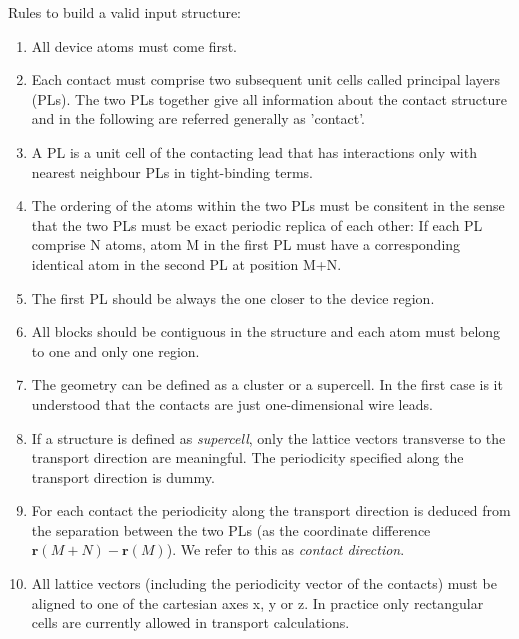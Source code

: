 Rules to build a valid input structure:
\begin{enumerate}
\item \label{rule1} All device atoms must come first.
\item \label{rule2} Each contact must comprise two subsequent unit cells called
  principal layers (PLs). The two PLs together give all information about the
  contact structure and in the following are referred generally as 'contact'.
\item \label{rule3} A PL is a unit cell of the contacting lead that has
  interactions only with nearest neighbour PLs in tight-binding terms.
\item \label{rule4} The ordering of the atoms within the two PLs must be
  consitent in the sense that the two PLs must be exact periodic replica of each
  other: If each PL comprise N atoms, atom M in the first PL must have a
  corresponding identical atom in the second PL at position M+N.
\item \label{rule5} The first PL should be always the one closer to the device
  region.
\item \label{rule6} All blocks should be contiguous in the structure and each
  atom must belong to one and only one region.
\item \label{rule7} The geometry can be defined as a cluster or a supercell. In
  the first case is it understood that the contacts are just one-dimensional
  wire leads.
\item \label{rule8} If a structure is defined as {\em supercell}, only the
  lattice vectors transverse to the transport direction are meaningful. The
  periodicity specified along the transport direction is dummy.
\item \label{rule9} For each contact the periodicity along the transport
  direction is deduced from the separation between the two PLs (as the
  coordinate difference $\mathbf{r}(M+N)-\mathbf{r}(M)$). We refer to this as
  {\em contact direction}.
\item \label{rule10} All lattice vectors (including the periodicity vector of
  the contacts) must be aligned to one of the cartesian axes x, y or z. In
  practice only rectangular cells are currently allowed in transport
  calculations.
\end{enumerate}
 

